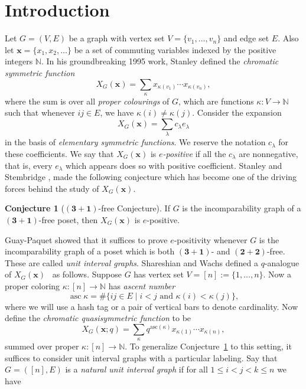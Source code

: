 \documentclass[10pt,a4paper]{amsart}
\theoremstyle{definition}
\newtheorem{conjecture}[theorem]{Conjecture}
\theoremstyle{remark}
\numberwithin{equation}{section}
\newcommand{\ka}{\kappa}
\newcommand{\la}{\lambda}
\newcommand{\bx}{\bm x}
\DeclareMathOperator{\asc}{asc}
\begin{document}
\section{Introduction}\label{section:introduction}
Let $G=(V,E)$ be a graph with vertex set $V=\{v_1,\ldots,v_n\}$ and edge set $E$.
Also let $\bm x=\{x_1,x_2,\ldots\}$ be a set of commuting variables indexed by the positive integers $\mathbb N$.
In his groundbreaking 1995 work, Stanley defined the \emph{chromatic symmetric function} \cite[Definition 2.1]{chromsym}
$$
X_G(\bm x)=\sum_\kappa x_{\kappa(v_1)}\cdots x_{\kappa(v_n)},
$$
where the sum is over all \emph{proper colourings} of $G$, which are functions $\kappa:V\to\mathbb N$ such that whenever $ij\in E$, we have $\kappa(i)\neq\kappa(j)$. Consider the expansion 
\begin{equation}
\label{c_la}
X_G(\bm x)=\sum_\lambda c_\lambda e_\lambda
\end{equation}
in the basis of \emph{elementary symmetric functions}. 
We reserve the notation $c_\la$ for these coefficients.
We say that $X_G(\bx)$ is \emph{$e$-positive} if all the $c_\la$ are nonnegative, that is, every $e_\la$ which appears does so with positive coefficient.
Stanley and Stembridge  \cite[Conjecture 5.1]{chromsym}, \cite[Conjecture 5.5]{stanstem} made the following conjecture which has become one of the driving forces behind the study of $X_G(\bx)$.
\begin{conjecture}[$(\bm 3+\bm 1)$-free Conjecture]
\label{SSconj}
 If $G$ is the incomparability graph of a $(\bm 3+\bm 1)$-free poset, 
 then $X_G(\bm x)$ is $e$-positive.
\end{conjecture}
Guay-Paquet \cite[Theorem 5.1]{stanstemreduction} showed that it suffices to prove $e$-positivity whenever $G$ is the incomparability graph of a 
poset which is both $(\bm 3+\bm 1)$- and $(\bm 2+\bm 2)$-free.  These are called {\em unit interval graphs}. Shareshian and Wachs defined a $q$-analogue of $X_G(\bm x)$~\cite[Definition 1.2]{chromposquasi} as follows.
Suppose $G$ has vertex set $V=[n]:=\{1,\ldots,n\}$.  Now a proper coloring 
$\ka:[n]\rightarrow\mathbb N$ has {\em ascent number}
$$
\asc\ka = \#\{ ij \in E \mid i<j \text{ and } \ka(i)<\ka(j)\},
$$
where we will use a hash tag or a pair of vertical bars to denote cardinality.  Now define the \emph{chromatic quasisymmetric function} to be
$$
X_G(\bm x;q)=\sum_\kappa q^{\text{asc}(\kappa)}x_{\kappa(1)}\cdots x_{\kappa(n)},
$$
summed over proper $\ka:[n]\rightarrow\mathbb N$.
To generalize Conjecture~\ref{SSconj} to this setting, it suffices to consider unit interval graphs with a particular labeling.  Say that $G=([n],E)$ is a {\em natural unit interval graph}  if for all $1\leq i<j<k\leq n$ we have
\end{document}
